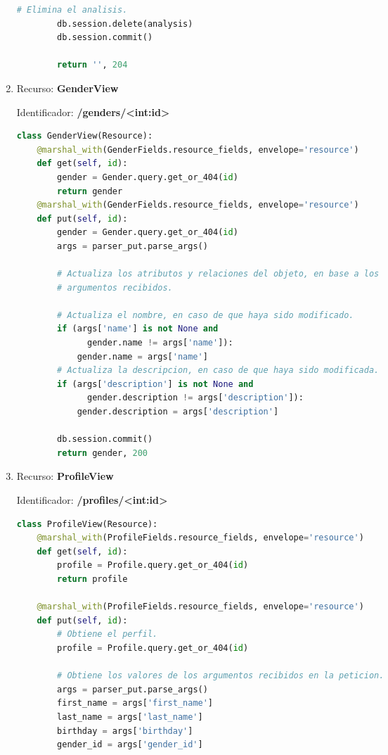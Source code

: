 \begin{enumerate}
\begin{lstlisting}[language=Python]
        # Elimina el analisis.
        db.session.delete(analysis)
        db.session.commit()

        return '', 204
\end{lstlisting}

\item Recurso: \textbf{GenderView} 

Identificador: \textbf{/genders/<int:id>}

\begin{lstlisting}[language=Python]
class GenderView(Resource):
    @marshal_with(GenderFields.resource_fields, envelope='resource')
    def get(self, id):
        gender = Gender.query.get_or_404(id)
        return gender
    @marshal_with(GenderFields.resource_fields, envelope='resource')
    def put(self, id):
        gender = Gender.query.get_or_404(id)
        args = parser_put.parse_args()

        # Actualiza los atributos y relaciones del objeto, en base a los
        # argumentos recibidos.

        # Actualiza el nombre, en caso de que haya sido modificado.
        if (args['name'] is not None and
              gender.name != args['name']):
            gender.name = args['name']
        # Actualiza la descripcion, en caso de que haya sido modificada.
        if (args['description'] is not None and
              gender.description != args['description']):
            gender.description = args['description']

        db.session.commit()
        return gender, 200
\end{lstlisting}	

\item Recurso: \textbf{ProfileView} 

Identificador: \textbf{/profiles/<int:id>}
\begin{lstlisting}[language=Python]
class ProfileView(Resource):
    @marshal_with(ProfileFields.resource_fields, envelope='resource')
    def get(self, id):
        profile = Profile.query.get_or_404(id)
        return profile

    @marshal_with(ProfileFields.resource_fields, envelope='resource')
    def put(self, id):
        # Obtiene el perfil.
        profile = Profile.query.get_or_404(id)

        # Obtiene los valores de los argumentos recibidos en la peticion.
        args = parser_put.parse_args()
        first_name = args['first_name']
        last_name = args['last_name']
        birthday = args['birthday']
        gender_id = args['gender_id']


\end{lstlisting}
\end{enumerate}
